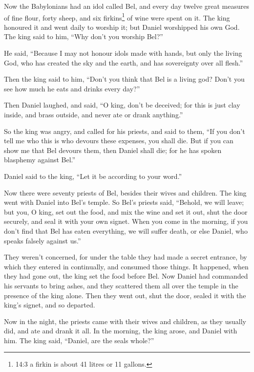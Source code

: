  Now the Babylonians had an idol called Bel, and every day
twelve great measures of fine flour, forty sheep, and six
firkins\footnote{14:3 a firkin is about 41 litres or 11 gallons.} of
wine were spent on it.  The king honoured it and went daily
to worship it; but Daniel worshipped his own God. The king said to him,
``Why don't you worship Bel?''

 He said, ``Because I may not honour idols made with hands,
but only the living God, who has created the sky and the earth, and has
sovereignty over all flesh.''

 Then the king said to him, ``Don't you think that Bel is a
living god? Don't you see how much he eats and drinks every day?''

 Then Daniel laughed, and said, ``O king, don't be deceived;
for this is just clay inside, and brass outside, and never ate or drank
anything.''

 So the king was angry, and called for his priests, and said
to them, ``If you don't tell me who this is who devours these expenses,
you shall die.  But if you can show me that Bel devours
them, then Daniel shall die; for he has spoken blasphemy against Bel.''

Daniel said to the king, ``Let it be according to your word.''

 Now there were seventy priests of Bel, besides their wives
and children. The king went with Daniel into Bel's temple. 
So Bel's priests said, ``Behold, we will leave; but you, O king, set out
the food, and mix the wine and set it out, shut the door securely, and
seal it with your own signet.  When you come in the
morning, if you don't find that Bel has eaten everything, we will suffer
death, or else Daniel, who speaks falsely against us.''

 They weren't concerned, for under the table they had made
a secret entrance, by which they entered in continually, and consumed
those things.  It happened, when they had gone out, the
king set the food before Bel. Now Daniel had commanded his servants to
bring ashes, and they scattered them all over the temple in the presence
of the king alone. Then they went out, shut the door, sealed it with the
king's signet, and so departed.

 Now in the night, the priests came with their wives and
children, as they usually did, and ate and drank it all. 
In the morning, the king arose, and Daniel with him.  The
king said, ``Daniel, are the seals whole?''

